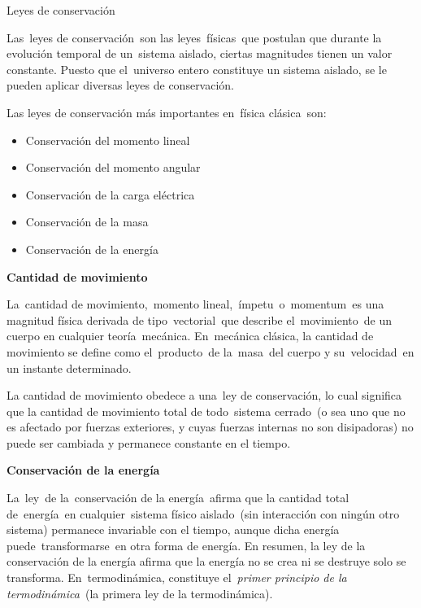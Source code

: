 \begin{myblock}{Leyes de conservación}
\begin{small}
Las leyes de conservación son las leyes físicas que postulan que durante la evolución temporal de un sistema aislado, ciertas magnitudes tienen un valor constante. Puesto que el universo entero constituye un sistema aislado, se le pueden aplicar diversas leyes de conservación.

Las leyes de conservación más importantes en física clásica son:
\begin{itemize}
\vspace{-2mm}\item Conservación del momento lineal
\vspace{-2mm} \item Conservación del momento angular
\vspace{-2mm}\item Conservación de la carga eléctrica
\vspace{-2mm}\item Conservación de la masa
\vspace{-2mm}\item Conservación de la energía
\end{itemize}

\textbf{Cantidad de movimiento}

La cantidad de movimiento, momento lineal, ímpetu o momentum es una magnitud física derivada de tipo vectorial que describe el movimiento de un cuerpo en cualquier teoría mecánica. En mecánica clásica, la cantidad de movimiento se define como el producto de la masa del cuerpo y su velocidad en un instante determinado. 

La cantidad de movimiento obedece a una ley de conservación, lo cual significa que la cantidad de movimiento total de todo sistema cerrado (o sea uno que no es afectado por fuerzas exteriores, y cuyas fuerzas internas no son disipadoras) no puede ser cambiada y permanece constante en el tiempo. 

\textbf{Conservación de la energía}

La ley de la conservación de la energía afirma que la cantidad total de energía en cualquier sistema físico aislado (sin interacción con ningún otro sistema) permanece invariable con el tiempo, aunque dicha energía puede transformarse en otra forma de energía. En resumen, la ley de la conservación de la energía afirma que la energía no se crea ni se destruye solo se transforma. En termodinámica, constituye el \emph{primer principio de la termodinámica} (la primera ley de la termodinámica).



\end{small}
\end{myblock}
